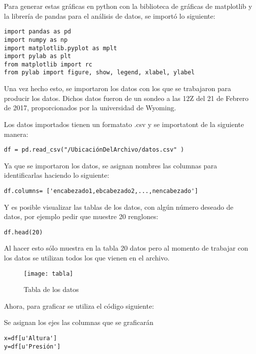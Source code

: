 \documentclass[12pt]{article}
\begin{document}
\newpage
Para generar estas gráficas en python con la biblioteca de gráficas de matplotlib y la librería de pandas para el análisis de datos, se importó lo siguiente:

\begin{verbatim}
import pandas as pd
import numpy as np
import matplotlib.pyplot as mplt
import pylab as plt
from matplotlib import rc
from pylab import figure, show, legend, xlabel, ylabel

\end{verbatim}

Una vez hecho esto, se importaron los datos con los que se trabajaron para producir los datos. Dichos datos fueron de un sondeo a las 12Z del 21 de Febrero de 2017, proporcionados por la universidad de Wyoming.

Los datos importados tienen un formatato .csv  y se importatont de la siguiente manera:

\begin{verbatim}
df = pd.read_csv("/UbicaciónDelArchivo/datos.csv" )
\end{verbatim}

Ya que se importaron los datos, se asignan nombres las columnas para identificarlas haciendo lo siguiente:

\begin{verbatim}
df.columns= ['encabezado1,ebcabezado2,...,nencabezado']
\end{verbatim}

Y es posible visualizar las tablas de los datos, con algún número deseado de datos, por ejemplo pedir que muestre 20 renglones:

\begin{verbatim}
df.head(20)     
\end{verbatim}

Al hacer esto sólo muestra en la tabla 20 datos pero al momento de trabajar con los datos se utilizan todos los que vienen en el archivo. 
\begin{figure}[ht]
\texttt{[image: tabla]}
\centering
\caption{Tabla de los datos}
\end{figure}

\newpage

Ahora, para graficar se utiliza el código siguiente:

Se asignan los ejes las columnas que se graficarán
\begin{verbatim}
x=df[u'Altura']
y=df[u'Presión']
\end{verbatim}
\end{document}
